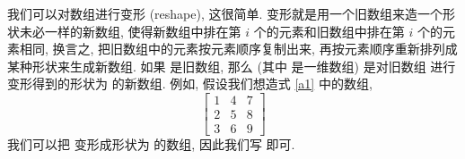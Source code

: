 我们可以对数组进行变形 (reshape), 这很简单. 变形就是用一个旧数组来造一个形状未必一样的新数组, 使得新数组中排在第 $i$ 个的元素和旧数组中排在第 $i$ 个的元素相同, 换言之, 把旧数组中的元素按元素顺序复制出来, 再按元素顺序重新排列成某种形状来生成新数组. 如果  是旧数组, 那么  (其中  是一维数组) 是对旧数组  进行变形得到的形状为  的新数组. 例如, 假设我们想造式 \eqref{a1} 中的数组,
\begin{equation}
    \begin{bmatrix}
        1&4&7\\
        2&5&8\\
        3&6&9
    \end{bmatrix}\label{a1}
\end{equation}
我们可以把 \ttt{[(i, i = 1, 9)]} 变形成形状为 \ttt{[3, 3]} 的数组, 因此我们写  即可.

